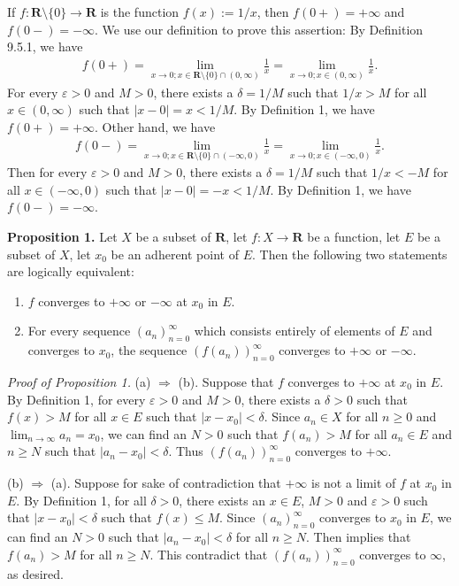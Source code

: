\documentclass{book}
\newcommand{\titl}[1]{\noindent\textbf{#1}}
\begin{document}
If $f:\mathbf{R}\setminus\{0\}\to\mathbf{R}$ is the function $f(x):=1/x$, then $f(0+)=+\infty$ and $f(0-)=-\infty$. We use our definition to prove this assertion: By Definition 9.5.1, we have
    \begin{align*}
        f(0+)=\lim_{x\to 0;x\in\mathbf{R}\setminus\{0\}\cap(0,\infty)}\frac{1}{x}=\lim_{x\to 0;x\in(0,\infty)}\frac{1}{x}.
    \end{align*}
For every $\varepsilon>0$ and $M>0$, there exists a $\delta=1/M$ such that $1/x>M$ for all $x\in(0,\infty)$ such that $|x-0|=x<1/M$. By Definition 1, we have $f(0+)=+\infty$. Other hand, we have
    \begin{align*}
        f(0-)=\lim_{x\to 0;x\in\mathbf{R}\setminus\{0\}\cap(-\infty,0)}\frac{1}{x}=\lim_{x\to 0;x\in(-\infty,0)}\frac{1}{x}.
    \end{align*}
Then for every $\varepsilon>0$ and $M>0$, there exists a $\delta=1/M$ such that $1/x<-M$ for all $x\in(-\infty,0)$ such that $|x-0|=-x<1/M$. By Definition 1, we have $f(0-)=-\infty$.

\begin{framed}
\titl{Proposition 1.} Let $X$ be a subset of $\mathbf{R}$, let $f:X\to\mathbf{R}$ be a function, let $E$ be a subset of $X$, let $x_0$ be an adherent point of $E$. Then the following two statements are logically equivalent:
\begin{enumerate}
    \item $f$ converges to $+\infty$ or $-\infty$ at $x_0$ in $E$.
    \item For every sequence $(a_n)_{n=0}^{\infty}$ which consists entirely of elements of $E$ and converges to $x_0$, the sequence $(f(a_n))_{n=0}^{\infty}$ converges to $+\infty$ or $-\infty$.
\end{enumerate}
\end{framed}

\noindent\emph{Proof of Proposition 1.} (a) $\Rightarrow$ (b). Suppose that $f$ converges to $+\infty$ at $x_0$ in $E$. By Definition 1, for every $\varepsilon>0$ and $M>0$, there exists a $\delta>0$ such that $f(x)>M$ for all $x\in E$ such that $|x-x_0|<\delta$. Since $a_n\in X$ for all $n\geq 0$ and $\lim_{n\to\infty}a_n=x_0$, we can find an $N>0$ such that $f(a_n)>M$ for all $a_n\in E$ and $n\geq N$ such that $|a_n-x_0|<\delta$. Thus $(f(a_n))_{n=0}^{\infty}$ converges to $+\infty$.

(b) $\Rightarrow$ (a). Suppose for sake of contradiction that $+\infty$ is not a limit of $f$ at $x_0$ in $E$. By Definition 1, for all $\delta>0$, there exists an $x\in E$, $M>0$ and $\varepsilon>0$ such that $|x-x_0|<\delta$ such that $f(x)\leq M$. Since $(a_n)_{n=0}^{\infty}$ converges to $x_0$ in $E$, we can find an $N>0$ such that $|a_n-x_0|<\delta$ for all $n\geq N$. Then implies that $f(a_n)>M$ for all $n\geq N$. This contradict that $(f(a_n))_{n=0}^{\infty}$ converges to $\infty$, as desired.
\end{document}
